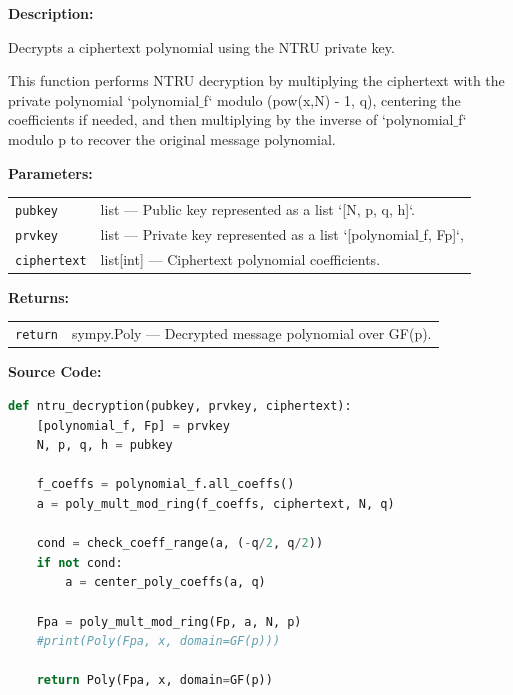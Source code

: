 \documentclass[a4paper,12pt]{article}
\begin{document}
\textbf{Description:}

Decrypts a ciphertext polynomial using the NTRU private key.

This function performs NTRU decryption by multiplying the ciphertext with the private
polynomial `polynomial$\_$f` modulo (pow(x,N) - 1, q), centering the coefficients if needed,
and then multiplying by the inverse of `polynomial$\_$f` modulo p to recover the original message polynomial.

\vspace{1em}
\textbf{Parameters:}

\vspace{1em}
\noindent
\begin{tabular}{p{3cm} p{11cm}}
\texttt{pubkey} & list — Public key represented as a list `[N, p, q, h]`. \\
\texttt{prvkey} & list — Private key represented as a list `[polynomial$\_$f, Fp]`, \\
\texttt{ciphertext} & list[int] — Ciphertext polynomial coefficients. \\
\end{tabular}

\vspace{1em}
\noindent
\textbf{Returns:}

\begin{tabular}{p{3cm} p{11cm}}
\texttt{return} & sympy.Poly — Decrypted message polynomial over GF(p). \\
\end{tabular}

\vspace{1em}
\textbf{Source Code:}

\begin{lstlisting}[language=Python]
def ntru_decryption(pubkey, prvkey, ciphertext):
    [polynomial_f, Fp] = prvkey
    N, p, q, h = pubkey

    f_coeffs = polynomial_f.all_coeffs()
    a = poly_mult_mod_ring(f_coeffs, ciphertext, N, q)

    cond = check_coeff_range(a, (-q/2, q/2))
    if not cond:
        a = center_poly_coeffs(a, q)

    Fpa = poly_mult_mod_ring(Fp, a, N, p)
    #print(Poly(Fpa, x, domain=GF(p)))

    return Poly(Fpa, x, domain=GF(p))
\end{lstlisting}



\end{document}

